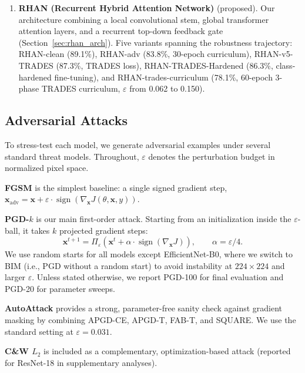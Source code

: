 \documentclass[12pt,a4paper]{article}
\begin{document}
\begin{enumerate}[leftmargin=1.5em]
  \item \textbf{RHAN (Recurrent Hybrid Attention Network)} (proposed).
        Our architecture combining a local convolutional stem, global
        transformer attention layers, and a recurrent top-down feedback
        gate (Section~\ref{sec:rhan_arch}). Five variants spanning the
        robustness trajectory: RHAN-clean (89.1\%), RHAN-adv (83.8\%,
        30-epoch curriculum), RHAN-v5-TRADES (87.3\%, TRADES loss),
        RHAN-TRADES-Hardened (86.3\%, class-hardened fine-tuning), and
        RHAN-trades-curriculum (78.1\%, 60-epoch 3-phase TRADES
        curriculum, $\varepsilon$ from 0.062 to 0.150).

\end{enumerate}

\subsection{Adversarial Attacks}

To stress-test each model, we generate adversarial examples under several
standard threat models. Throughout, $\varepsilon$ denotes the perturbation
budget in normalized pixel space.

\textbf{FGSM} \citep{goodfellow2015explaining} is the simplest baseline: a
single signed gradient step,
$\mathbf{x}_{\text{adv}} = \mathbf{x} + \varepsilon \cdot
\operatorname{sign}(\nabla_{\!\mathbf{x}} J(\theta,\mathbf{x},y))$.

\textbf{PGD-$k$} \citep{madry2018towards} is our main first-order attack. Starting
from an initialization inside the $\varepsilon$-ball, it takes $k$ projected
gradient steps:
\begin{equation}
  \mathbf{x}^{t+1} = \Pi_{\varepsilon}\!\left(
    \mathbf{x}^{t} +
    \alpha\cdot\operatorname{sign}(\nabla_{\!\mathbf{x}} J)
  \right), \qquad \alpha = \varepsilon/4.
  \label{eq:pgd}
\end{equation}
We use random starts for all models except EfficientNet-B0, where we switch to
BIM (i.e., PGD without a random start) to avoid instability at
$224{\times}224$ and larger $\varepsilon$. Unless stated otherwise, we report
PGD-100 for final evaluation and PGD-20 for parameter sweeps.

\textbf{AutoAttack} \citep{croce2020reliable} provides a strong, parameter-free
sanity check against gradient masking by combining APGD-CE, APGD-T, FAB-T, and
SQUARE. We use the standard setting at $\varepsilon{=}0.031$.

\textbf{C\&W $L_2$} \citep{carlini2017towards} is included as a complementary,
optimization-based attack (reported for ResNet-18 in supplementary analyses).
\end{document}
